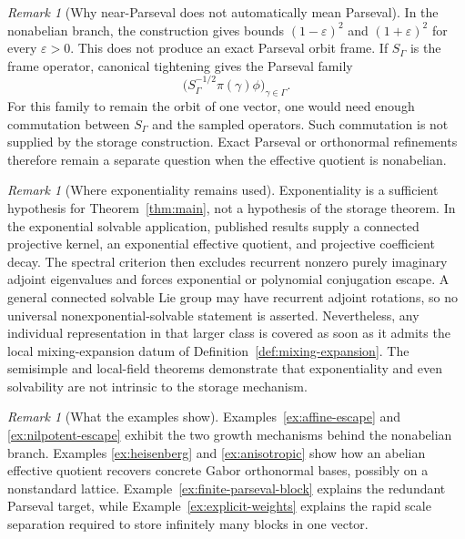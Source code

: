 \documentclass[reqno]{amsart}
\numberwithin{equation}{section}
\theoremstyle{definition}
\theoremstyle{remark}
\newtheorem{remark}[theorem]{Remark}
\begin{document}
\begin{remark}[Why near-Parseval does not automatically mean Parseval]
In the nonabelian branch, the construction gives bounds
$(1-\varepsilon)^2$ and $(1+\varepsilon)^2$ for every $\varepsilon>0$.
This does not produce an exact Parseval orbit frame.  If $S_\Gamma$ is the
frame operator, canonical tightening gives the Parseval family
\[
 \bigl(S_\Gamma^{-1/2}\pi(\gamma)\phi\bigr)_{\gamma\in\Gamma}.
\]
For this family to remain the orbit of one vector, one would need enough
commutation between $S_\Gamma$ and the sampled operators.  Such commutation
is not supplied by the storage construction.  Exact Parseval or
orthonormal refinements therefore remain a separate question when the
effective quotient is nonabelian.
\end{remark}

\begin{remark}[Where exponentiality remains used]
Exponentiality is a sufficient hypothesis for Theorem~\ref{thm:main}, not a
hypothesis of the storage theorem.  In the exponential solvable application,
published results supply a connected projective kernel, an exponential
effective quotient, and projective coefficient decay.  The spectral criterion
then excludes recurrent nonzero purely imaginary adjoint eigenvalues and
forces exponential or polynomial conjugation escape.  A general connected
solvable Lie group may have recurrent adjoint rotations, so no universal
nonexponential-solvable statement is asserted.  Nevertheless, any individual
representation in that larger class is covered as soon as it admits the local
mixing-expansion datum of Definition~\ref{def:mixing-expansion}.  The
semisimple and local-field theorems demonstrate that exponentiality and even
solvability are not intrinsic to the storage mechanism.
\end{remark}

\begin{remark}[What the examples show]
Examples~\ref{ex:affine-escape} and \ref{ex:nilpotent-escape} exhibit the two
growth mechanisms behind the nonabelian branch.  Examples
\ref{ex:heisenberg} and \ref{ex:anisotropic} show how an abelian effective
quotient recovers concrete Gabor orthonormal bases, possibly on a
nonstandard lattice.  Example~\ref{ex:finite-parseval-block} explains the
redundant Parseval target, while Example~\ref{ex:explicit-weights} explains
the rapid scale separation required to store infinitely many blocks in one
vector.
\end{remark}
\end{document}
